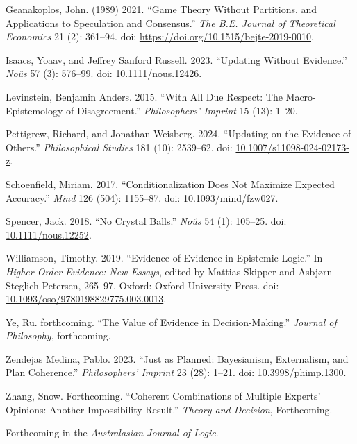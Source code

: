 \documentclass[
  11pt,
  letterpaper,
  DIV=11,
  numbers=noendperiod,
  twoside]{scrartcl}
\newlength{\cslhangindent}
\newenvironment{CSLReferences}[2] %
 {\begin{list}{}{%
  \setlength{\itemindent}{0pt}
  \setlength{\leftmargin}{0pt}
  \setlength{\parsep}{0pt}
  \ifodd #1
   \setlength{\leftmargin}{\cslhangindent}
   \setlength{\itemindent}{-1\cslhangindent}
  \fi
  \setlength{\itemsep}{#2\baselineskip}}}
 {\end{list}}
\begin{document}
\begin{CSLReferences}{1}{0}
Geanakoplos, John. (1989) 2021. {``Game Theory Without Partitions, and
Applications to Speculation and Consensus.''} \emph{The B.E. Journal of
Theoretical Economics} 21 (2): 361--94. doi:
\url{https://doi.org/10.1515/bejte-2019-0010}.

Isaacs, Yoaav, and Jeffrey Sanford Russell. 2023. {``Updating Without
Evidence.''} \emph{Noûs} 57 (3): 576--99. doi:
\href{https://doi.org/10.1111/nous.12426}{10.1111/nous.12426}.

Levinstein, Benjamin Anders. 2015. {``With All Due Respect: The
Macro-Epistemology of Disagreement.''} \emph{Philosophers' Imprint} 15
(13): 1--20.

Pettigrew, Richard, and Jonathan Weisberg. 2024. {``Updating on the
Evidence of Others.''} \emph{Philosophical Studies} 181 (10): 2539--62.
doi:
\href{https://doi.org/10.1007/s11098-024-02173-z}{10.1007/s11098-024-02173-z}.

Schoenfield, Miriam. 2017. {``Conditionalization Does Not Maximize
Expected Accuracy.''} \emph{Mind} 126 (504): 1155--87. doi:
\href{https://doi.org/10.1093/mind/fzw027}{10.1093/mind/fzw027}.

Spencer, Jack. 2018. {``No Crystal Balls.''} \emph{Noûs} 54 (1):
105--25. doi:
\href{https://doi.org/10.1111/nous.12252}{10.1111/nous.12252}.

Williamson, Timothy. 2019. {``Evidence of Evidence in Epistemic
Logic.''} In \emph{Higher-Order Evidence: New Essays}, edited by Mattias
Skipper and Asbjørn Steglich-Petersen, 265--97. Oxford: {O}xford
{U}niversity {P}ress. doi:
\href{https://doi.org/10.1093/oso/9780198829775.003.0013}{10.1093/oso/9780198829775.003.0013}.

Ye, Ru. forthcoming. {``The Value of Evidence in Decision-Making.''}
\emph{Journal of Philosophy}, forthcoming.

Zendejas Medina, Pablo. 2023. {``Just as Planned: Bayesianism,
Externalism, and Plan Coherence.''} \emph{Philosophers' Imprint} 23
(28): 1--21. doi:
\href{https://doi.org/10.3998/phimp.1300}{10.3998/phimp.1300}.

Zhang, Snow. Forthcoming. {``Coherent Combinations of Multiple Experts'
Opinions: Another Impossibility Result.''} \emph{Theory and Decision},
Forthcoming.

\end{CSLReferences}



\noindent \vspace{1in} Forthcoming in the \textit{Australasian Journal of Logic}.
\end{document}

